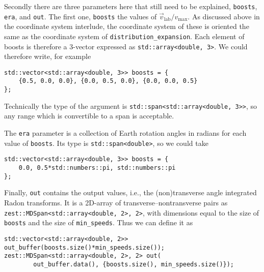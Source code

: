 \documentclass{article}
\begin{document}
Secondly there are three parameters here that still need to be explained, \texttt{boosts}, \texttt{era}, and \texttt{out}. The first one, \texttt{boosts} the values of $\vec{v}_\text{lab}/v_\text{max}$. As discussed above in the coordinate system interlude, the coordinate system of these is oriented the same as the coordinate system of \texttt{distribution_expansion}. Each element of boosts is therefore a 3-vector expressed as \texttt{std::array<double, 3>}. We could therefore write, for example
\begin{verbatim}
std::vector<std::array<double, 3>> boosts = {
    {0.5, 0.0, 0.0}, {0.0, 0.5, 0.0}, {0.0, 0.0, 0.5}
};
\end{verbatim}
Technically the type of the argument is \texttt{std::span<std::array<double, 3>>}, so any range which is convertible to a span is acceptable.

The \texttt{era} parameter is a collection of Earth rotation angles in radians for each value of \texttt{boosts}. Its type is \texttt{std::span<double>}, so we could take
\begin{verbatim}
std::vector<std::array<double, 3>> boosts = {
    0.0, 0.5*std::numbers::pi, std::numbers::pi
};
\end{verbatim}

Finally, \texttt{out} contains the output values, i.e., the (non)transverse angle integrated Radon transforms. It is a 2D-array of transverse--nontransverse pairs as \texttt{zest::MDSpan<std::array<double, 2>, 2>}, with dimensions equal to the size of \texttt{boosts} and the size of \texttt{min_speeds}. Thus we can define it as
\begin{verbatim}
std::vector<std::array<double, 2>> out_buffer(boosts.size()*min_speeds.size());
zest::MDSpan<std::array<double, 2>, 2> out(
        out_buffer.data(), {boosts.size(), min_speeds.size()});
\end{verbatim}
\end{document}
